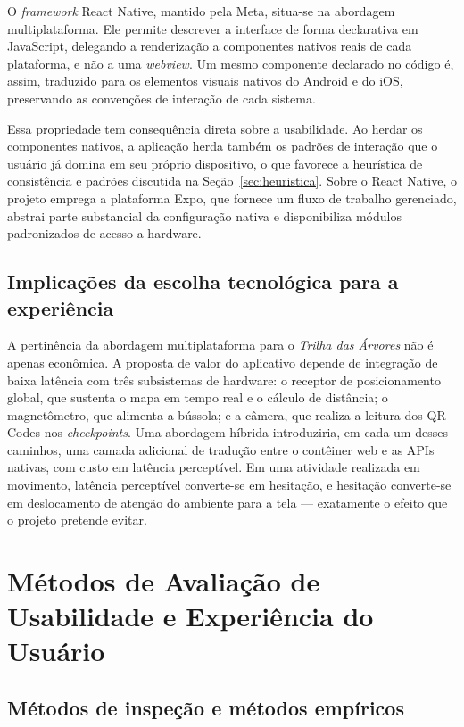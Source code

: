 O \textit{framework} React Native, mantido pela Meta, situa-se na abordagem
multiplataforma. Ele permite descrever a interface de forma declarativa em
JavaScript, delegando a renderização a componentes nativos reais de cada
plataforma, e não a uma \textit{webview}. Um mesmo componente declarado no código
é, assim, traduzido para os elementos visuais nativos do Android e do iOS,
preservando as convenções de interação de cada sistema.

Essa propriedade tem consequência direta sobre a usabilidade. Ao herdar os
componentes nativos, a aplicação herda também os padrões de interação que o
usuário já domina em seu próprio dispositivo, o que favorece a heurística de
consistência e padrões discutida na Seção~\ref{sec:heuristica}. Sobre o React
Native, o projeto emprega a plataforma Expo, que fornece um fluxo de trabalho
gerenciado, abstrai parte substancial da configuração nativa e disponibiliza
módulos padronizados de acesso a hardware.

\subsection{Implicações da escolha tecnológica para a experiência}

A pertinência da abordagem multiplataforma para o \textit{Trilha das Árvores} não
é apenas econômica. A proposta de valor do aplicativo depende de integração de
baixa latência com três subsistemas de hardware: o receptor de posicionamento
global, que sustenta o mapa em tempo real e o cálculo de distância; o
magnetômetro, que alimenta a bússola; e a câmera, que realiza a leitura dos QR
Codes nos \textit{checkpoints}. Uma abordagem híbrida introduziria, em cada um
desses caminhos, uma camada adicional de tradução entre o contêiner web e as APIs
nativas, com custo em latência perceptível. Em uma atividade realizada em
movimento, latência perceptível converte-se em hesitação, e hesitação converte-se
em deslocamento de atenção do ambiente para a tela --- exatamente o efeito que o
projeto pretende evitar.

\section{Métodos de Avaliação de Usabilidade e Experiência do Usuário}
\label{sec:metodos}

\subsection{Métodos de inspeção e métodos empíricos}

